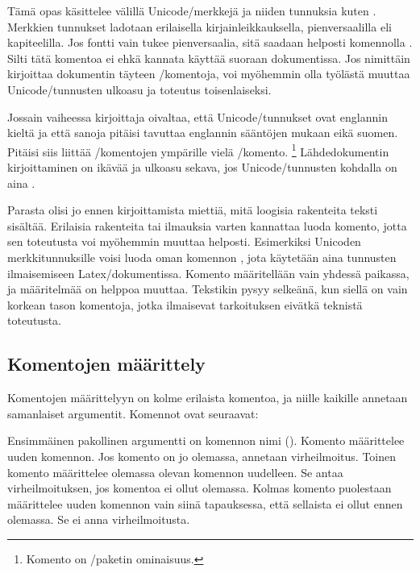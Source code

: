 Tämä opas käsittelee välillä Unicode\-/merkkejä ja niiden tunnuksia
kuten . Merkkien tunnukset
ladotaan erilaisella kirjainleikkauksella, pienversaalilla eli
kapiteelilla. Jos fontti vain tukee pienversaalia, sitä saadaan helposti
komennolla . Silti tätä komentoa ei ehkä kannata
käyttää suoraan dokumentissa. Jos nimittäin kirjoittaa dokumentin
täyteen \-/komentoja, voi myöhemmin olla työlästä
muuttaa Unicode\-/tunnusten ulko\-asu ja toteutus toisenlaiseksi.

Jossain vaiheessa kirjoittaja oivaltaa, että Unicode\-/tunnukset ovat
englannin kieltä ja että sanoja pitäisi tavuttaa englannin sääntöjen
mukaan eikä suomen. Pitäisi siis liittää \-/komentojen ympärille vielä \-/komento.%
\footnote{Komento  on
  \-/paketin ominaisuus.} Lähdedokumentin
kirjoittaminen on ikävää ja ulko\-asu sekava, jos Unicode\-/tunnusten
kohdalla on aina .

Parasta olisi jo ennen kirjoittamista miettiä, mitä loogisia rakenteita
teksti sisältää. Erilaisia rakenteita tai ilmauksia varten kannattaa
luoda komento, jotta sen toteutusta voi myöhemmin muuttaa helposti.
Esimerkiksi Unicoden merkkitunnuksille voisi luoda oman komennon
, jota käytetään aina tunnusten ilmaisemiseen
Latex\-/dokumentissa. Komento määritellään vain yhdessä paikassa, ja
määritelmää on helppoa muuttaa. Tekstikin pysyy selkeänä, kun siellä on
vain korkean tason komentoja, jotka ilmaisevat tarkoituksen eivätkä
teknistä toteutusta.

\subsection{Komentojen määrittely}
\label{luku:komennot-määr}

Komentojen määrittelyyn on kolme erilaista komentoa, ja niille kaikille
annetaan samanlaiset argumentit. Komennot ovat seuraavat:

\begin{koodilohkosis}
  \newcommand     {\nimi}[n][oletus]{määritelmä}
  \renewcommand   {\nimi}[n][oletus]{määritelmä}
  \providecommand {\nimi}[n][oletus]{määritelmä}
\end{koodilohkosis}

Ensimmäinen pakollinen argumentti on komennon nimi ().
Komento  määrittelee uuden komennon. Jos komento
on jo olemassa, annetaan virheilmoitus. Toinen komento  määrittelee olemassa olevan komennon uudelleen. Se antaa
virheilmoituksen, jos komentoa ei ollut olemassa. Kolmas komento
 puolestaan määrittelee uuden komennon
vain siinä tapauksessa, että sellaista ei ollut ennen olemassa. Se ei
anna virheilmoitusta.

